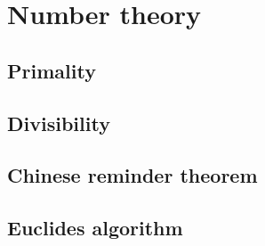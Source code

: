 
\chapter{Number theory}
\section{Primality}

\section{Divisibility}

\section{Chinese reminder theorem}

\section{Euclides algorithm}

